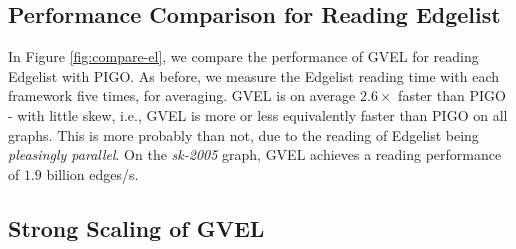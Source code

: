 






\subsection{Performance Comparison for Reading Edgelist}

In Figure \ref{fig:compare-el}, we compare the performance of GVEL for reading Edgelist with PIGO. As before, we measure the Edgelist reading time with each framework five times, for averaging. GVEL is on average $2.6\times$ faster than PIGO - with little skew, i.e., GVEL is more or less equivalently faster than PIGO on all graphs. This is more probably than not, due to the reading of Edgelist being \textit{pleasingly parallel}. On the \textit{sk-2005} graph, GVEL achieves a reading performance of $1.9$ billion edges/s.


% 




\subsection{Strong Scaling of GVEL}

